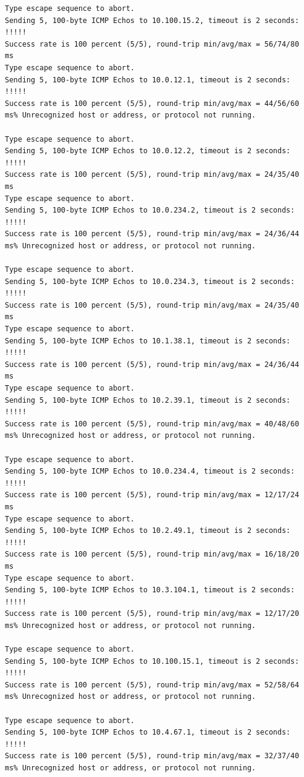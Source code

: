 \documentclass[12pt,twoside,a4paper]{article}
\begin{document}
\noindent
{\selectfont
\begin{small}
\begin{verbatim}
Type escape sequence to abort.
Sending 5, 100-byte ICMP Echos to 10.100.15.2, timeout is 2 seconds:
!!!!!
Success rate is 100 percent (5/5), round-trip min/avg/max = 56/74/80 ms
Type escape sequence to abort.
Sending 5, 100-byte ICMP Echos to 10.0.12.1, timeout is 2 seconds:
!!!!!
Success rate is 100 percent (5/5), round-trip min/avg/max = 44/56/60 ms% Unrecognized host or address, or protocol not running.

Type escape sequence to abort.
Sending 5, 100-byte ICMP Echos to 10.0.12.2, timeout is 2 seconds:
!!!!!
Success rate is 100 percent (5/5), round-trip min/avg/max = 24/35/40 ms
Type escape sequence to abort.
Sending 5, 100-byte ICMP Echos to 10.0.234.2, timeout is 2 seconds:
!!!!!
Success rate is 100 percent (5/5), round-trip min/avg/max = 24/36/44 ms% Unrecognized host or address, or protocol not running.

Type escape sequence to abort.
Sending 5, 100-byte ICMP Echos to 10.0.234.3, timeout is 2 seconds:
!!!!!
Success rate is 100 percent (5/5), round-trip min/avg/max = 24/35/40 ms
Type escape sequence to abort.
Sending 5, 100-byte ICMP Echos to 10.1.38.1, timeout is 2 seconds:
!!!!!
Success rate is 100 percent (5/5), round-trip min/avg/max = 24/36/44 ms
Type escape sequence to abort.
Sending 5, 100-byte ICMP Echos to 10.2.39.1, timeout is 2 seconds:
!!!!!
Success rate is 100 percent (5/5), round-trip min/avg/max = 40/48/60 ms% Unrecognized host or address, or protocol not running.

Type escape sequence to abort.
Sending 5, 100-byte ICMP Echos to 10.0.234.4, timeout is 2 seconds:
!!!!!
Success rate is 100 percent (5/5), round-trip min/avg/max = 12/17/24 ms
Type escape sequence to abort.
Sending 5, 100-byte ICMP Echos to 10.2.49.1, timeout is 2 seconds:
!!!!!
Success rate is 100 percent (5/5), round-trip min/avg/max = 16/18/20 ms
Type escape sequence to abort.
Sending 5, 100-byte ICMP Echos to 10.3.104.1, timeout is 2 seconds:
!!!!!
Success rate is 100 percent (5/5), round-trip min/avg/max = 12/17/20 ms% Unrecognized host or address, or protocol not running.

Type escape sequence to abort.
Sending 5, 100-byte ICMP Echos to 10.100.15.1, timeout is 2 seconds:
!!!!!
Success rate is 100 percent (5/5), round-trip min/avg/max = 52/58/64 ms% Unrecognized host or address, or protocol not running.

Type escape sequence to abort.
Sending 5, 100-byte ICMP Echos to 10.4.67.1, timeout is 2 seconds:
!!!!!
Success rate is 100 percent (5/5), round-trip min/avg/max = 32/37/40 ms% Unrecognized host or address, or protocol not running.


\end{verbatim}
\end{small}}
\end{document}
